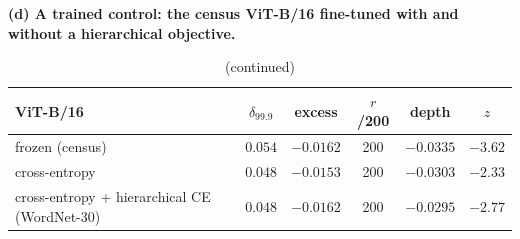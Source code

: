 \begin{table}[tbp]\ContinuedFloat
\centering
\scriptsize
\setlength{\tabcolsep}{2.2pt}
\begingroup
\noindent\textbf{(d) A trained control: the census ViT-B/16 fine-tuned with and without a hierarchical objective.}\par\vspace{1.5pt}
\footnotesize
\setlength{\tabcolsep}{4pt}
\begin{tabular}{lccccc}
\toprule
ViT-B/16 & $\hat\delta_{99.9}$ & excess & $r$/200 & depth & $z$ \\
\midrule
frozen (census) & $0.054$ & $-0.0162$ & 200 & $-0.0335$ & $-3.62$ \\
cross-entropy & $0.048$ & $-0.0153$ & 200 & $-0.0303$ & $-2.33$ \\
cross-entropy + hierarchical CE (WordNet-30) & $0.048$ & $-0.0162$ & 200 & $-0.0295$ & $-2.77$ \\
\bottomrule
\end{tabular}
\par\vspace{5pt}
\endgroup
\caption{(continued)}
\end{table}

